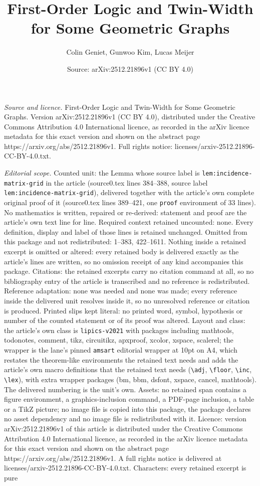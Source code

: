 \documentclass[10pt,a4paper]{amsart}
\title[First-Order Logic and Twin-Width for Some Geometric Graphs]{First-Order Logic and Twin-Width for Some Geometric Graphs}
\author{Colin Geniet, Gunwoo Kim, Lucas Meijer}
\date{Source: arXiv:2512.21896v1 (CC BY 4.0)}
\begin{document}
\maketitle

\noindent\emph{Source and licence.} First-Order Logic and Twin-Width for Some Geometric Graphs. Version arXiv:2512.21896v1 (CC BY 4.0), distributed under the Creative Commons Attribution 4.0 International licence, as recorded in the arXiv licence metadata for this exact version and shown on the abstract page https://arxiv.org/abs/2512.21896v1. Full rights notice: licenses/arxiv-2512.21896-CC-BY-4.0.txt.\par\smallskip

\noindent\textit{Editorial scope.} Counted unit: the Lemma whose source label is \texttt{lem:incidence-matrix-grid} in the article (source0.tex lines 384--388, source label \texttt{lem:incidence-matrix-grid}), delivered together with the article's own complete original proof of it (source0.tex lines 389--421, one \texttt{proof} environment of 33 lines). No mathematics is written, repaired or re-derived: statement and proof are the article's own text line for line. Required context retained uncounted: none. Every definition, display and label of those lines is retained unchanged. Omitted from this package and not redistributed: 1--383, 422--1611. Nothing inside a retained excerpt is omitted or altered: every retained body is delivered exactly as the article's lines are written, so no omission receipt of any kind accompanies this package. Citations: the retained excerpts carry no citation command at all, so no bibliography entry of the article is transcribed and no reference is redistributed. Reference adaptation: none was needed and none was made; every reference inside the delivered unit resolves inside it, so no unresolved reference or citation is produced. Printed slips kept literal: no printed word, symbol, hypothesis or number of the counted statement or of its proof was altered. Layout and class: the article's own class is \texttt{lipics-v2021} with packages including mathtools, todonotes, comment, tikz, circuitikz, apxproof, xcolor, xspace, scalerel; the wrapper is the lane's pinned \texttt{amsart} editorial wrapper at 10pt on A4, which restates the theorem-like environments the retained text needs and adds the article's own macro definitions that the retained text needs (\texttt{\textbackslash adj}, \texttt{\textbackslash floor}, \texttt{\textbackslash inc}, \texttt{\textbackslash lex}), with extra wrapper packages (bm, bbm, dsfont, xspace, cancel, mathtools). The delivered numbering is the unit's own. Assets: no retained span contains a figure environment, a graphics-inclusion command, a PDF-page inclusion, a table or a TikZ picture; no image file is copied into this package, the package declares no asset dependency and no image file is redistributed with it. Licence: version arXiv:2512.21896v1 of this article is distributed under the Creative Commons Attribution 4.0 International licence, as recorded in the arXiv licence metadata for this exact version and shown on the abstract page https://arxiv.org/abs/2512.21896v1. A full rights notice is delivered at licenses/arxiv-2512.21896-CC-BY-4.0.txt. Characters: every retained excerpt is pure 
\end{document}
